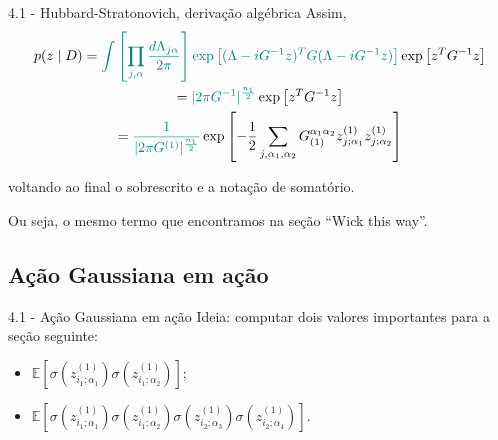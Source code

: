 \documentclass{beamer}
\begin{document}
\begin{frame}{4.1 - Hubbard-Stratonovich, derivação algébrica}
    \small
    Assim,
    \small
    \begin{gather*}
        p(z \mid D) =  \textcolor{teal}{\int \left[ \prod_{j,\alpha} \frac{d\Lambda_{j\alpha}}{2\pi} \right] 
        \exp \left[ (\Lambda - i G^{-1} z)^T G (\Lambda - i G^{-1} z)\right] }
        \exp\left[z^TG^{-1}z\right] \\
        = \textcolor{teal}{|2\pi G^{-1}|^{\frac{n_1}{2}}} \exp \left[z^TG^{-1}z\right] \\
        = \textcolor{teal}{\frac{1}{|2\pi G^{(1)}|^{\frac{n_1}{2}}}} \exp \left[- \frac{1}{2} \sum_{j, \alpha_1, \alpha_2} G_{(1)}^{\alpha_1 \alpha_2} z^{(1)}_{j; \alpha_1} z^{(1)}_{j; \alpha_2}\right]
    \end{gather*}

    voltando ao final o sobrescrito e a notação de somatório.

    \vspace{1em}
    \pause

    Ou seja, o mesmo termo que encontramos na seção ``Wick this way''.

\end{frame}

\subsection{Ação Gaussiana em ação}
\begin{frame}
\tableofcontents[currentsubsection]
\end{frame}

\begin{frame}{4.1 - Ação Gaussiana em ação}
    Ideia: computar dois valores importantes para a seção seguinte: \pause
    \small
    \begin{itemize}
        \item $\mathbb{E} \left[ \sigma\left( z^{(1)}_{i_1;\alpha_1} \right) \sigma\left( z^{(1)}_{i_1;\alpha_2} \right) \right]$; \pause
        \item $\mathbb{E} \left[
            \sigma\left( z^{(1)}_{i_1;\alpha_1} \right)
            \sigma\left( z^{(1)}_{i_1;\alpha_2} \right)
            \sigma\left( z^{(1)}_{i_2;\alpha_3} \right)
            \sigma\left( z^{(1)}_{i_2;\alpha_4} \right)
            \right]$.
    \end{itemize}
\end{frame}
\end{document}
